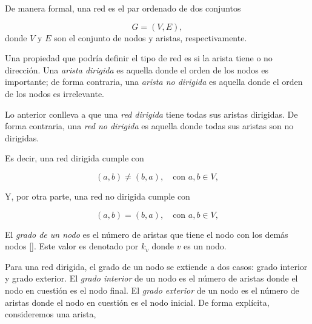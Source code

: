 \documentclass[../main.tex]{subfiles}
\begin{document}
De manera formal, una red es el par ordenado de dos conjuntos

\begin{equation}
    \label{eq:marcoteorico_networkdefinition}
    G = (V,E),
\end{equation}
donde $V$ y $E$  son el conjunto de nodos y aristas, respectivamente.


Una propiedad que podría definir el tipo de red es si la arista tiene o no dirección. Una \textit{arista dirigida} es aquella donde el orden de los nodos es importante; de forma contraria, una \textit{arista no dirigida} es aquella donde el orden de los nodos es irrelevante. 

Lo anterior conlleva a que una \textit{red dirigida} tiene todas sus aristas dirigidas. De forma contraria, una \textit{red no dirigida} es aquella donde todas sus aristas son no dirigidas.  

%

Es decir, una red dirigida cumple con

\begin{equation*}
    (a,b) \neq (b,a), \quad \text{con } a,b \in V,
\end{equation*}

Y, por otra parte, una red no dirigida cumple con

\begin{equation*}
    (a,b) = (b,a), \quad \text{con } a,b \in V,
\end{equation*}



El \textit{grado de un nodo} es el número de aristas que tiene el nodo con los demás nodos [\cite{barabasi2013network}]. Este valor es denotado por $k_v$ donde $v$ es un nodo. 


Para una red dirigida, el grado de un nodo se extiende a dos casos: grado interior y grado exterior.  
El \textit{grado interior} de un nodo es el número de aristas donde el nodo en cuestión es el nodo final. El \textit{grado exterior} de un nodo es el número de aristas donde el nodo en cuestión es el nodo inicial. De forma explícita, consideremos una arista,
\end{document}
